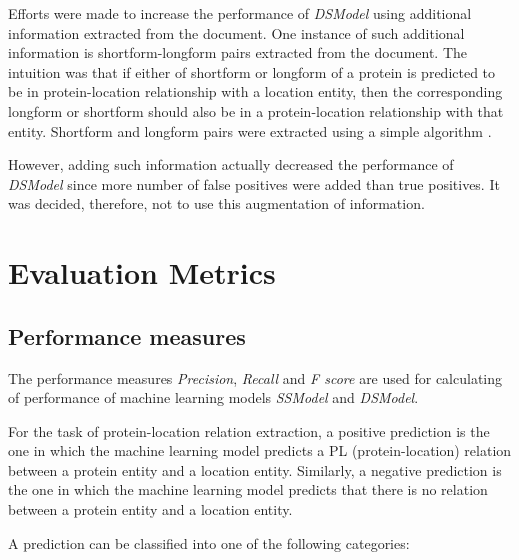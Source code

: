Efforts were made to increase the performance of \textit{DSModel} using additional information extracted from the document. One instance of such additional information is shortform-longform pairs extracted from the document. The intuition was that if either of shortform or longform of a protein is predicted to be in protein-location relationship with a location entity, then the corresponding longform or shortform should also be in a protein-location relationship with that entity. Shortform and longform pairs were extracted using a simple algorithm \cite{hearst2003simple}.

However, adding such information actually decreased the performance of \textit{DSModel} since more number of false positives were added than true positives. It was decided, therefore, not to use this augmentation of information.

\section{Evaluation Metrics} \label{sec:evaluationCriteria}

\subsection{Performance measures}
The performance measures \textit{Precision}, \textit{Recall} and \textit{F score} are used for calculating of performance of machine learning models \textit{SSModel} and \textit{DSModel}.

For the task of protein-location relation extraction, a positive prediction is the one in which the machine learning model predicts a PL (protein-location) relation between a protein entity and a location entity. Similarly, a negative prediction is the one in which the machine learning model predicts that there is no relation between a protein entity and a location entity. 

A prediction can be classified into one of the following categories:


